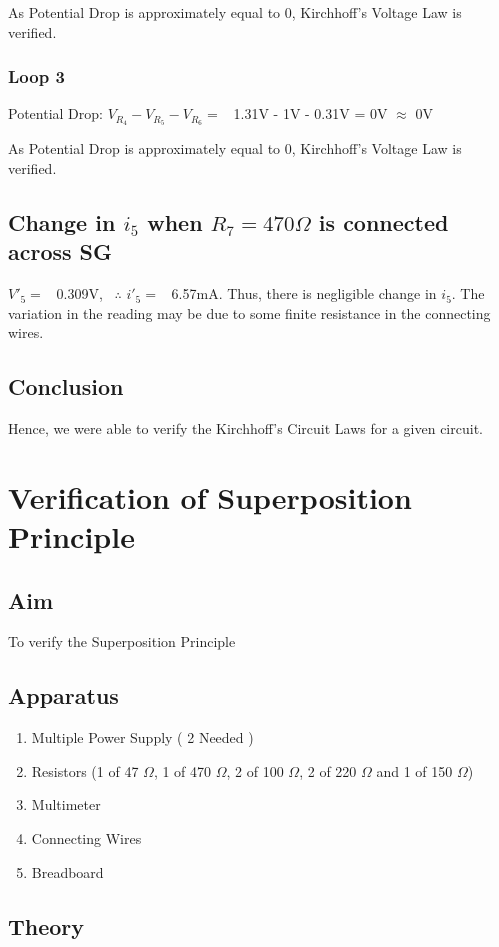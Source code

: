 \documentclass{article}
\begin{document}
\noindent
As Potential Drop is approximately equal to 0, Kirchhoff's Voltage Law is verified.

\subsubsection{Loop 3}
Potential Drop: $V_{R_4}-V_{R_5}-V_{R_6}=$ \ 1.31V - 1V - 0.31V = 0V $\approx$ 0V

\noindent
As Potential Drop is approximately equal to 0, Kirchhoff's Voltage Law is verified.
\subsection{Change in $i_5$ when $R_7=470\Omega$ is connected across SG}
$V'_5=$ \ 0.309V, \  $\therefore$ $i'_5=$ \  6.57mA. Thus, there is negligible change in $i_5$. The variation in the reading may be due to some finite resistance in the connecting wires.

\subsection{Conclusion}
Hence, we were able to verify the Kirchhoff’s Circuit Laws for a given circuit.
\newpage

\section{Verification of Superposition Principle}
\subsection{Aim}
To verify the Superposition Principle 

\subsection{Apparatus}
\begin{enumerate}
    \item Multiple Power Supply ( 2 Needed )
    \item Resistors (1 of 47 $\Omega$, 1 of 470 $\Omega$, 2 of 100 $\Omega$, 2 of 220 $\Omega$ and 1 of 150 $\Omega$)
    \item Multimeter
    \item Connecting Wires
    \item Breadboard
\end{enumerate}

\subsection{Theory}
\end{document}
